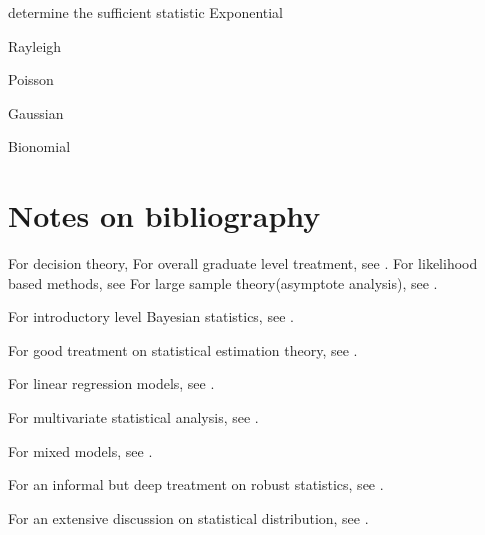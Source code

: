 \begin{refsection}
determine the sufficient statistic
Exponential

Rayleigh

Poisson

Gaussian

Bionomial
\fi


\section{Notes on bibliography}
For decision theory, \cite{young2005essentials}\cite{moon2000mathematical}
For overall graduate level treatment, see \cite{casella2002statistical}\cite{hoggintroduction}.
For likelihood based methods, see \cite{pawitan2001all}
For large sample theory(asymptote analysis), see \cite{lehmann1999elements}.

For introductory level Bayesian statistics, see \cite{hoff2009first}.

For good treatment on statistical estimation theory, see \cite{kay1993fundamentals}.


For linear regression models, see \cite{kutner2003applied}\cite{seber2012linear}.

For multivariate statistical analysis, see \cite{johnson2007applied}.

For mixed models, see \cite{mcculloch2001generalized}.

For an informal but deep treatment on robust statistics, see \cite{wilcox2010fundamentals}.

For an extensive discussion on statistical distribution, see \cite{forbes2011statistical}\cite{krishnamoorthy2016handbook}.

\printbibliography
\end{refsection}

